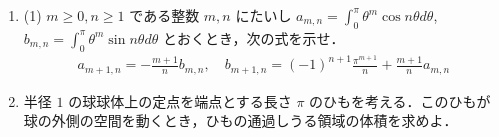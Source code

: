 \documentclass[a4paper,10pt]{ltjsarticle}
\begin{document}
\begin{oframed}
  \begin{enumerate}
    \item (1) $m \ge 0, n \ge 1$ である整数 $m, n$ にたいし $\displaystyle a_{m,n} = \int_0^\pi \theta^m \cos n\theta d\theta$, $\displaystyle b_{m,n} = \int_0^\pi \theta^m \sin n\theta d\theta$ とおくとき，次の式を示せ．
          \begin{align*}
            a_{m+1,n} = -\frac{m+1}{n}b_{m,n}, \quad b_{m+1,n} = (-1)^{n+1}\frac{\pi^{m+1}}{n} + \frac{m+1}{n}a_{m,n}
          \end{align*}

    \item 半径 $1$ の球球体上の定点を端点とする長さ $\pi$ のひもを考える．このひもが球の外側の空間を動くとき，ひもの通過しうる領域の体積を求めよ．
  \end{enumerate}
\end{oframed}
\end{document}
